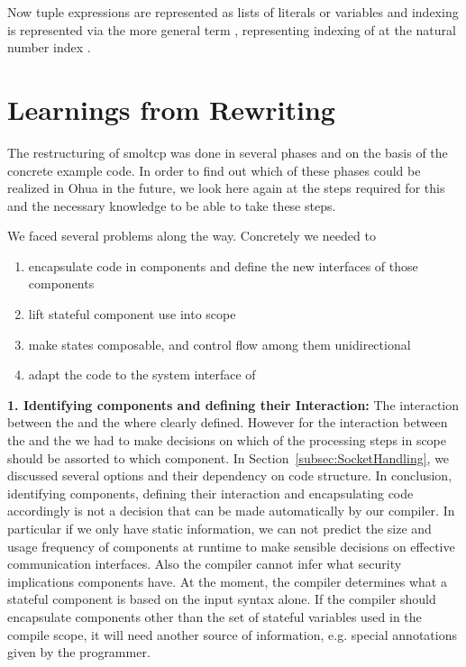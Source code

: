 Now tuple expressions are represented as lists of literals or variables  and indexing is represented via the more general term , representing indexing of  at the natural number index . \\

\section{Learnings from Rewriting}

The restructuring of smoltcp was done in several phases and on the basis of the concrete example code. In order to find out which of these phases could be realized in Ohua in the future, we look here again at the steps required for this and the necessary knowledge to be able to take these steps. 

We faced several problems along the way. Concretely we needed to 
\begin{enumerate}
    \item encapsulate code in components and define the new interfaces of those components
    \item lift stateful component use into scope
    \item make states composable, and control flow among them unidirectional
    \item adapt the code to the system interface of \md
\end{enumerate}

\textbf{1. Identifying components and defining their Interaction: } The interaction between the \stack{} and the \dev{} where clearly defined. However for the interaction between the \stack{} and the \store{} we had to make decisions on which of the processing steps in scope should be assorted to which component. In Section~\ref{subsec:SocketHandling}, we discussed several options and their dependency on code structure. In conclusion, identifying components, defining their interaction and encapsulating code accordingly is not a decision that can be made automatically by our compiler. In particular if we only have static information, we can not predict the size and usage frequency of components at runtime to make sensible decisions on effective communication interfaces. Also the compiler cannot infer what security implications components have. At the moment, the compiler determines what a stateful component is based on the input syntax alone. If the compiler should encapsulate components other than the set of stateful variables used in the compile scope, it will need another source of information, e.g. special annotations given by the programmer.

